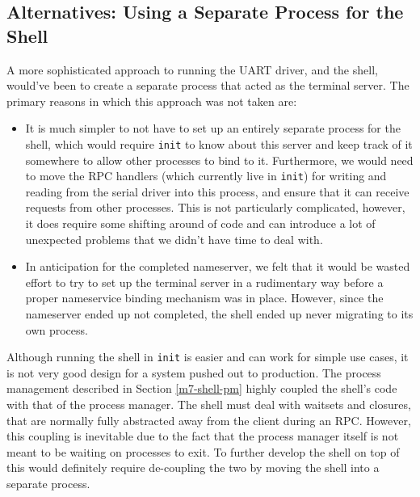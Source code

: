 \subsection{Alternatives: Using a Separate Process for the Shell}
A more sophisticated approach to running the UART driver, and the shell, would've been to create a separate process that acted as the terminal server. The primary reasons in which this approach was not taken are:

\begin{itemize}
    \item It is much simpler to not have to set up an entirely separate process for the shell, which would require \texttt{init} to know about this server and keep track of it somewhere to allow other processes to bind to it. Furthermore, we would need to move the RPC handlers (which currently live in \texttt{init}) for writing and reading from the serial driver into this process, and ensure that it can receive requests from other processes. This is not particularly complicated, however, it does require some shifting around of code and can introduce a lot of unexpected problems that we didn't have time to deal with.
    \item In anticipation for the completed nameserver, we felt that it would be wasted effort to try to set up the terminal server in a rudimentary way before a proper nameservice binding mechanism was in place. However, since the nameserver ended up not completed, the shell ended up never migrating to its own process.
\end{itemize}

Although running the shell in \texttt{init} is easier and can work for simple use cases, it is not very good design for a system pushed out to production. The process management described in Section \ref{m7-shell-pm} highly coupled the shell's code with that of the process manager. The shell must deal with waitsets and closures, that are normally fully abstracted away from the client during an RPC. However, this coupling is inevitable due to the fact that the process manager itself is not meant to be waiting on processes to exit. To further develop the shell on top of this would definitely require de-coupling the two by moving the shell into a separate process.



